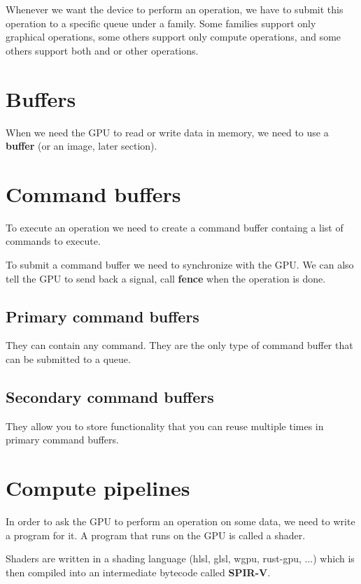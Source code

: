 \documentclass[preview]{standalone}
\begin{document}
Whenever we want the device to perform an operation,
we have to submit this operation to a specific queue under a family.
Some families support only graphical operations,
some others support only compute operations, and some others support both
and or other operations.

\section{Buffers}

When we need the GPU to read or write data in memory,
we need to use a \textbf{buffer} (or an image, later section).

\section{Command buffers}

To execute an operation we need to create a command buffer
containg a list of commands to execute.

To submit a command buffer we need to synchronize with the GPU.
We can also tell the GPU to send back a signal, call \textbf{fence} when
the operation is done.

\subsection{Primary command buffers}

They can contain any command.
They are the only type of command buffer that can be submitted to a queue.

\subsection{Secondary command buffers}

They allow you to store functionality that you can reuse multiple times in primary command buffers. 

\section{Compute pipelines}

In order to ask the GPU to perform an operation on some data, we need to write
a program for it. A program that runs on the GPU is called a shader.

Shaders are written in a shading language (hlsl, glsl, wgpu, rust-gpu, ...)
which is then compiled into an intermediate bytecode called \textbf{SPIR-V}.
\end{document}
